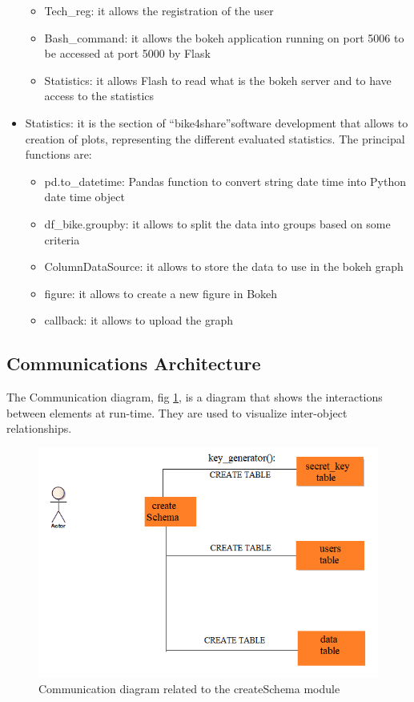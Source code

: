 \documentclass{article}
\begin{document}
\begin{itemize}
\begin{itemize}
         \item Tech\_reg: it allows the registration of the user
         \item Bash\_command: it allows the bokeh application running on port 5006 to be accessed at port 5000 by Flask
         \item Statistics: it allows Flash to read what is the bokeh server and to have access to the statistics
     \end{itemize}
     \item Statistics: it is the section of “bike4share”software development that  allows to creation of plots, representing the different evaluated statistics. The principal functions are:
     \begin{itemize}
          \item pd.to\_datetime: Pandas function to convert string date time into Python date time object
          \item df\_bike.groupby: it allows to split the data into groups based on some criteria
          \item ColumnDataSource: it allows to store the data to use in the bokeh graph
          \item figure: it allows to create a new figure in Bokeh
          \item callback: it allows to upload the graph 
     \end{itemize}
\end{itemize}

      
\subsection{Communications Architecture}
The Communication diagram, fig \ref{fig:createSchema}, is a diagram that shows the interactions between elements at run-time. They  are used to visualize inter-object relationships.

\begin{figure}[h]
    \centering
    \includegraphics[width=0.75\linewidth]{image/COMM_TAB.png}
    \caption{Communication diagram related to the createSchema module}
    \label{fig:createSchema}
\end{figure}
\end{document}
